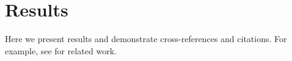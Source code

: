 \section{Results}
Here we present results and demonstrate cross-references and citations. For example, see \cite{smith2023} for related work.


